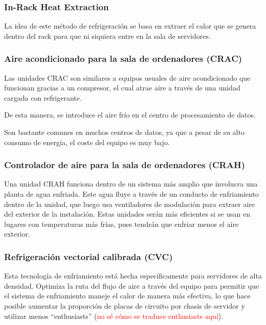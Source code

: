 \subsubsection*{In-Rack Heat Extraction}

La idea de este método de refrigeración se basa en extraer el calor que se genera dentro del rack para que ni siquiera entre en la sala de servidores.

\subsubsection*{Aire acondicionado para la sala de ordenadores (CRAC)}

Las unidades CRAC son similares a equipos usuales de aire acondicionado que funcionan gracias a un compresor, el cual atrae aire a través de una unidad cargada con refrigerante.

De esta manera, se introduce el aire frío en el centro de procesamiento de datos.

Son bastante comunes en muchos centros de datos, ya que a pesar de su alto consumo de energía, el coste del equipo es muy bajo.

\subsubsection*{Controlador de aire para la sala de ordenadores (CRAH)}

Una unidad CRAH funciona dentro de un sistema más amplio que involucra una planta de agua enfriada. Este agua fluye a través de un conducto de enfriamiento dentro de la unidad, que luego usa ventiladores de modulación para extraer aire del exterior de la instalación. Estas unidades serán más eficientes si se usan en lugares con temperaturas más frías, pues tendrán que enfriar menos el aire exterior.

\subsubsection*{Refrigeración vectorial calibrada (CVC)}

Esta tecnología de enfriamiento está hecha específicamente para servidores de alta densidad. Optimiza la ruta del flujo de aire a través del equipo para permitir que el sistema de enfriamiento maneje el calor de manera más efectiva, lo que hace posible aumentar la proporción de placas de circuito por chasis de servidor y utilizar menos “enthusiasts” (\textcolor{red}{no sé cómo se traduce enthusiasts aquí}).

